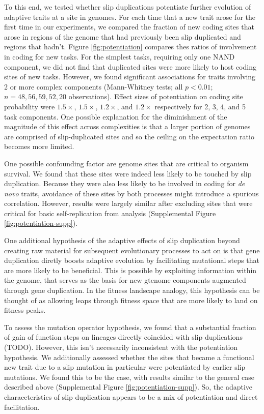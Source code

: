To this end, we tested whether slip duplications potentiate further evolution of adaptive traits at a site in genomes.
For each time that a new trait arose for the first time in our experiments, we compared the fraction of new coding sites that arose in regions of the genome that had previously been slip duplicated and regions that hadn't.
Figure \ref{fig:potentiation} compares thes ratios of involvement in coding for new tasks.
For the simplest tasks, requiring only one NAND component, we did not find that duplicated sites were more likely to host coding sites of new tasks.
However, we found significant associations for traits involving 2 or more complex components (Mann-Whitney tests; all $p < 0.01$; $n=48,56,59,52,20$ observations).
Effect sizes of potentiation on coding site probability were $1.5\times$, $1.5\times$, $1.2\times$, and $1.2\times$ respectively for 2, 3, 4, and 5 task components.
One possible explanation for the diminishment of the magnitude of this effect across complexities is that a larger portion of genomes are comprised of slip-duplicated sites and so the ceiling on the expectation ratio becomes more limited.

One possible confounding factor are genome sites that are critical to organism survival.
We found that these sites were indeed less likely to be touched by slip duplication.
Because they were also less likely to be involved in coding for \textit{de novo} traits, avoidance of these sites by both processes might introduce a spurious correlation.
However, results were largely similar after excluding sites that were critical for basic self-replication from analysis (Supplemental Figure \ref{fig:potentiation-supp}).

One additional hypothesis of the adaptive effects of slip duplication beyond creating raw material for subsequent evolutionary processes to act on is that gene duplication diretly boosts adaptive evolution by facilitating mutational steps that are more likely to be beneficial.
This is possible by exploiting information within the genome, that serves as the basis for new gtenome components augmented through gene duplication.
In the fitness landscape analogy, this hypothesis can be thought of as allowing leaps through fitness space that are more likely to land on fitness peaks.

To assess the mutation operator hypothesis, we found that a substantial fraction of gain of function steps on lineages directly coincided with slip duplications (TODO).
However, this isn't necessarily inconsistent with the potentiation hypothesis.
We additionally assessed whether the sites that became a functional new trait due to a slip mutation in particular were potentiated by earlier slip mutations.
We found this to be the case, with results similar to the general case described above (Supplemental Figure \ref{fig:potentiation-supp}).
So, the adaptive characeteristics of slip duplication appears to be a mix of potentiation and direct facilitation.

